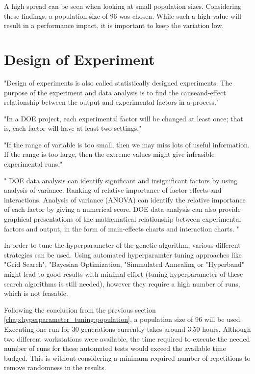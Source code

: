 A high spread can be seen when looking at small population sizes. Considering these findings, a population size of 96 was chosen. While such a high value will result in a performance impact, it is important to keep the variation low.


\section{Design of Experiment}
\label{chap:hyperparameter_tuning:other_parameter}

"Design of experiments is also called statistically designed experiments. The purpose of the experiment and data analysis is to find the causeand-effect relationship between the output and experimental factors in a process."\cite{yang_design_2009}

"In a DOE project, each experimental factor will be changed at least once; that is, each factor will have at least two settings."\cite{yang_design_2009}

"If the range of variable is too small, then we may miss lots of useful information. If the range is too large, then the extreme values might give infeasible experimental runs."\cite{yang_design_2009}



"
DOE data analysis can identify significant and insignificant factors by using analysis of variance.
Ranking of relative importance of factor effects and interactions. Analysis of variance (ANOVA) can identify the relative importance of each factor by giving a numerical score.
DOE data analysis can also provide graphical presentations of the mathematical relationship between experimental factors and output, in the form of main-effects charts and interaction charts.
"\cite{yang_design_2009}

In order to tune the hyperparameter of the genetic algorithm, various different strategies can be used. Using automated hyperparamter tuning approaches like "Grid Search", "Bayesian Optimization, "Simmulated Annealing or "Hyperband" might lead to good results with minimal effort (tuning hyperparameter of these search algorithms is still needed), however they require a high number of runs, which is not feasable. 

Following the conclusion from the previous section \ref{chap:hyperparameter_tuning:population}, a population size of 96 will be used. Executing one run for 30 generations currently takes around 3:50 hours. Although two different workstations were available, the time required to execute the needed number of runs for these automated tests would exceed the available time budged. This is without considering a minimum required number of repetitions to remove randomness in the results.

